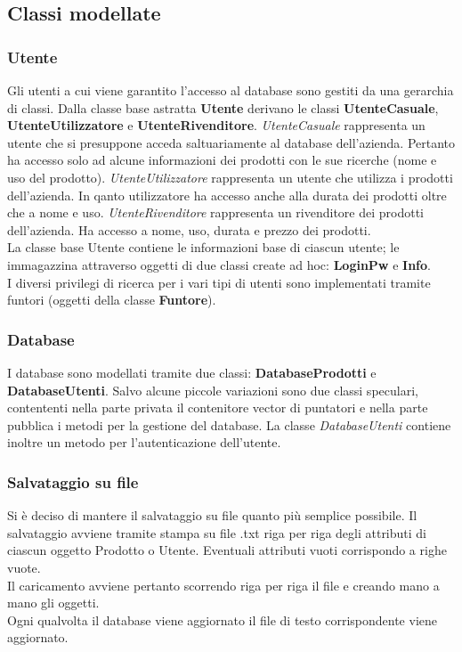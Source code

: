 \documentclass[a4paper,10pt] {article}
\begin{document}
\subsection{Classi modellate}
\subsubsection{Utente}
Gli utenti a cui viene garantito l'accesso al database sono gestiti da una gerarchia di classi. Dalla classe base astratta \textbf{Utente} derivano le classi 
\textbf{UtenteCasuale}, \textbf{UtenteUtilizzatore} e \textbf{UtenteRivenditore}. \textsl{UtenteCasuale} rappresenta un utente che si presuppone acceda saltuariamente al
database dell'azienda. Pertanto ha accesso solo ad alcune informazioni dei prodotti con le sue ricerche (nome e uso del prodotto). \textsl{UtenteUtilizzatore} rappresenta
un utente che utilizza i prodotti dell'azienda. In qanto utilizzatore ha accesso anche alla durata dei prodotti oltre che a nome e uso. \textsl{UtenteRivenditore}
rappresenta un rivenditore dei prodotti dell'azienda. Ha accesso a nome, uso, durata e prezzo dei prodotti.\\
La classe base Utente contiene le informazioni base di ciascun utente; le immagazzina attraverso oggetti di due classi create ad hoc: \textbf{LoginPw} e \textbf{Info}.\\
I diversi privilegi di ricerca per i vari tipi di utenti sono implementati tramite funtori (oggetti della classe \textbf{Funtore}).

\subsubsection{Database}
I database sono modellati tramite due classi: \textbf{DatabaseProdotti} e \textbf{DatabaseUtenti}. Salvo alcune piccole variazioni sono due classi speculari, contententi nella
parte privata il contenitore vector di puntatori e nella parte pubblica i metodi per la gestione del database. La classe \textsl{DatabaseUtenti} contiene inoltre un metodo
per l'autenticazione dell'utente.

\subsubsection{Salvataggio su file}
Si è deciso di mantere il salvataggio su file quanto più semplice possibile. Il salvataggio avviene tramite stampa su file .txt riga per riga degli attributi di 
ciascun oggetto Prodotto o Utente. Eventuali attributi vuoti corrispondo a righe vuote.\\
Il caricamento avviene pertanto scorrendo riga per riga il file e creando mano a mano gli oggetti.\\
Ogni qualvolta il database viene aggiornato il file di testo corrispondente viene aggiornato.
\end{document}

